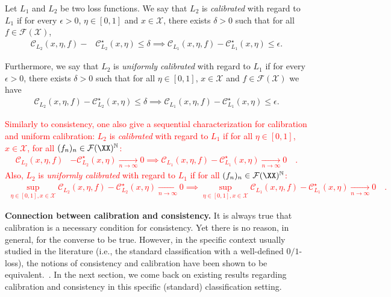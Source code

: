 \begin{definition}[Calibration]
Let $L_1$ and $L_2$ be two loss functions. We say that $L_2$ is \emph{calibrated} with regard to $L_1$ if for every $\epsilon>0$, $\eta\in[0,1]$ and $x\in\mathcal{X}$, there exists $ \delta>0$ such that for all $f\in\mathcal{F}(\mathcal{X})$,
\begin{align*}
    \mathcal{C}_{L_2}(x,\eta,f)- &\mathcal{C}^\star_{L_2}(x,\eta)\leq\delta\implies\mathcal{C}_{L_1}(x,\eta,f)- \mathcal{C}^\star_{L_1}(x,\eta)\leq \epsilon.
\end{align*}

Furthermore, we say that $L_2$ is \emph{uniformly calibrated} with regard to $L_1$ if for every $\epsilon>0$, there exists $ \delta>0$ such that for all $\eta\in[0,1]$, $x\in\mathcal{X}$ and $f\in\mathcal{F}(\mathcal{X})$ we have
\begin{align*}
    \mathcal{C}_{L_2}(x,\eta,f)- \mathcal{C}^\star_{L_2}(x,\eta)\leq\delta\implies\mathcal{C}_{L_1}(x,\eta,f)- \mathcal{C}^\star_{L_1}(x,\eta)\leq \epsilon.
\end{align*}
\end{definition}

\textcolor{red}{
Similarly to consistency, one also give a sequential characterization for calibration and uniform calibration: $L_2$ is \emph{calibrated} with regard to $L_1$ if for all $\eta\in[0,1]$, $x\in\mathcal{X}$, for all $(f_n)_n\in\mathcal{F}(\XX)^\mathbb{N}$:
\begin{align*}
   \mathcal{C}_{L_2}(x,\eta,f)&- \mathcal{C}^\star_{L_2}(x,\eta)\xrightarrow[n\to\infty]{} 0
   \implies \mathcal{C}_{L_1}(x,\eta,f)- \mathcal{C}^\star_{L_1}(x,\eta)\xrightarrow[n\to\infty]{} 0\quad.
\end{align*}
} 
\textcolor{red}{
Also, $L_2$ is \emph{uniformly calibrated} with regard to $L_1$ if for all $(f_n)_n\in\mathcal{F}(\XX)^\mathbb{N}$:
\begin{align*}
    \sup_{\eta\in[0,1],x\in\mathcal{X}} \mathcal{C}_{L_2}(x,\eta,f)- \mathcal{C}^\star_{L_2}(x,\eta)\xrightarrow[n\to\infty]{} 0\implies\sup_{\eta\in[0,1],x\in\mathcal{X}} \mathcal{C}_{L_1}(x,\eta,f)- \mathcal{C}^\star_{L_1}(x,\eta)\xrightarrow[n\to\infty]{} 0\quad.
\end{align*} }


\textbf{Connection between calibration and consistency.}
It is always true that calibration is a necessary condition for consistency. Yet there is no reason, in general, for the converse to be true. However, in the specific context usually studied in the literature (i.e., the standard classification with a well-defined $0/1$-loss), the notions of consistency and calibration have been shown to be equivalent.~\citep{zhang2004statistical,bartlett2006convexity,steinwart2007compare}. In the next section, we come back on existing results regarding calibration and consistency in this specific (standard) classification setting. 


